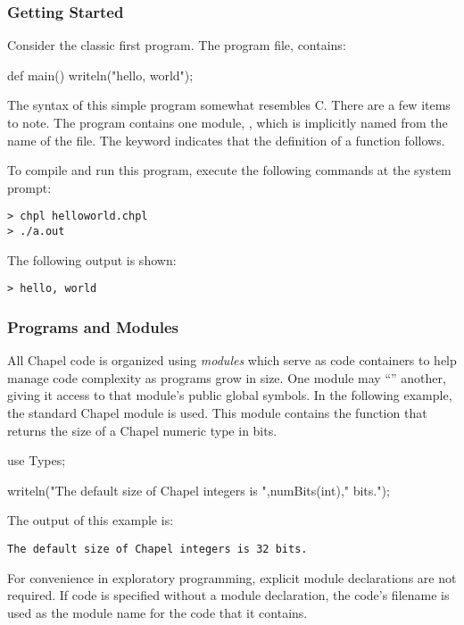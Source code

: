 \subsubsection{Getting Started}

Consider the classic first program.  The program file,
 contains:
\begin{chapel}
def main() {
  writeln("hello, world");
}
\end{chapel}

The syntax of this simple program somewhat resembles C.  There are a
few items to note.
The program contains one module, , which is implicitly
named from the name of the file.  The keyword  indicates that the
definition of a function follows.

To compile and run this program, execute the following
commands at the system prompt:
\begin{verbatim}
> chpl helloworld.chpl
> ./a.out
\end{verbatim}
The following output is shown:
\begin{verbatim}
> hello, world
\end{verbatim}

\subsubsection{Programs and Modules}
\label{Programs_and_Modules}

All Chapel code is organized using \emph{modules} which serve as code
containers to help manage code complexity as programs grow in size.
One module may ``'' another, giving it access to that
module's public global symbols.  In the following example, the
standard Chapel module  is used.  This module contains
the  function that returns the size of a Chapel numeric
type in bits. 
\begin{chapel}
use Types;

writeln("The default size of Chapel integers is ",numBits(int)," bits.");
\end{chapel}
The output of this example is:
\begin{verbatim}
The default size of Chapel integers is 32 bits.
\end{verbatim}

For convenience in exploratory programming,
explicit module declarations are not required.  If code is specified 
without a module declaration, the code's
filename is used as the module name for the code that it contains.

